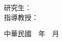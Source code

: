 
\ThesisUnnumberedPage
\begin{center}
  {
   \LARGE\bfseries
   \univCname\\[0.6em]
   \ThesisIfBlank{\collCname}{}{\collCname\\[0.6em]}%
   \deptCname\\[0.6em]
   \\[3.5em]

   \Large
   \cTitle\\[1.5em]
   \large\mdseries
   \eTitle\\[4em]
  }

  {\large
   研究生：\myCname\\[0.8em]
   指導教授：\advisorCnameA\\[0.4em]
  }

  \vfill
  {\large 中華民國\ \cYear\ 年\ \cMonth\ 月}
\end{center}
\clearpage

